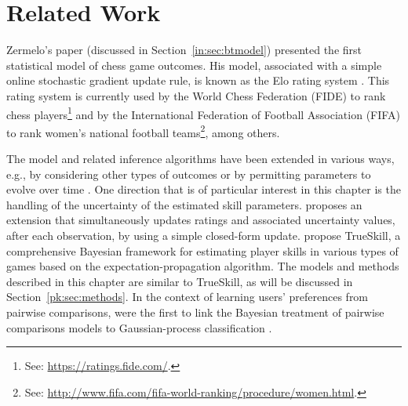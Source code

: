 \section{Related Work}
\label{pk:sec:relwork}

Zermelo's \citeyear{zermelo1928berechnung} paper (discussed in Section~\ref{in:sec:btmodel}) presented the first statistical model of chess game outcomes.
His model, associated with a simple online stochastic gradient update rule, is known as the Elo rating system \citep{elo1978rating}.
This rating system is currently used by the World Chess Federation (FIDE) to rank chess players\footnote{See: \url{https://ratings.fide.com/}.} and by the International Federation of Football Association (FIFA) to rank women's national football teams\footnote{See: \url{http://www.fifa.com/fifa-world-ranking/procedure/women.html}.}, among others.

The model and related inference algorithms have been extended in various ways, e.g., by considering other types of outcomes \citep{rao1967ties, maher1982modelling} or by permitting parameters to evolve over time \citep{glickman1993paired, fahrmeir1994dynamic, cattelan2013dynamic}.
One direction that is of particular interest in this chapter is the handling of the uncertainty of the estimated skill parameters.
\citet{glickman1999parameter} proposes an extension that simultaneously updates ratings and associated uncertainty values, after each observation, by using a simple closed-form update.
\citet{herbrich2006trueskill} propose TrueSkill, a comprehensive Bayesian framework for estimating player skills in various types of games based on the expectation-propagation algorithm.
The models and methods described in this chapter are similar to TrueSkill, as will be discussed in Section~\ref{pk:sec:methods}.
In the context of learning users' preferences from pairwise comparisons, \citet{chu2005preference} were the first to link the Bayesian treatment of pairwise comparisons models to Gaussian-process classification \citep{rasmussen2006gaussian}.
